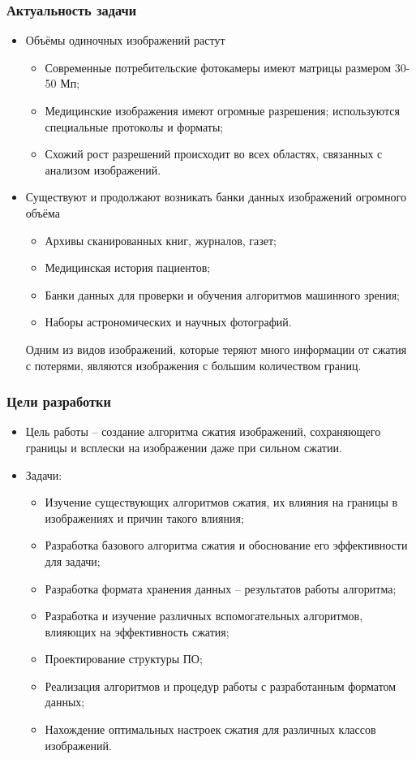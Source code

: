 \documentclass{beamer}
\begin{document}
\begin{frame}
\frametitle{Актуальность задачи}

\begin{itemize}
\item Объёмы одиночных изображений растут
  \begin{itemize}
  \item Современные потребительские фотокамеры имеют матрицы размером 30-50 Мп;
  \item Медицинские изображения имеют огромные разрешения; используются
    специальные протоколы и форматы;
  \item Схожий рост разрешений происходит во всех областях, связанных с анализом
    изображений.
  \end{itemize}
\item Существуют и продолжают возникать банки данных изображений огромного
  объёма
  \begin{itemize}
  \item Архивы сканированных книг, журналов, газет;
  \item Медицинская история пациентов;
  \item Банки данных для проверки и обучения алгоритмов машинного зрения;
  \item Наборы астрономических и научных фотографий.
  \end{itemize}

Одним из видов изображений, которые теряют много информации от сжатия с
потерями, являются изображения с большим количеством границ.
\end{itemize}

\end{frame}

\begin{frame}
\frametitle{Цели разработки}

\begin{itemize}
\item Цель работы -- создание алгоритма сжатия изображений, сохраняющего границы
  и всплески на изображении даже при сильном сжатии.
\item Задачи:
  \begin{itemize}
  \item Изучение существующих алгоритмов сжатия, их влияния на границы в
    изображениях и причин такого влияния;
  \item Разработка базового алгоритма сжатия и обоснование его эффективности для
    задачи;
  \item Разработка формата хранения данных -- результатов работы алгоритма;
  \item Разработка и изучение различных вспомогательных алгоритмов, влияющих на
    эффективность сжатия;
  \item Проектирование структуры ПО;
  \item Реализация алгоритмов и процедур работы с разработанным форматом данных;
  \item Нахождение оптимальных настроек сжатия для различных классов изображений.
  \end{itemize}
\end{itemize}

\end{frame}
\end{document}
